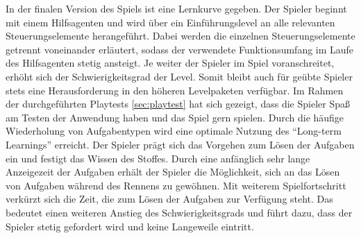 In der finalen Version des Spiels ist eine Lernkurve gegeben. Der Spieler beginnt mit einem Hilfsagenten und wird über ein Einführungslevel an alle relevanten Steuerungselemente herangeführt. Dabei werden die einzelnen Steuerungselemente getrennt voneinander erläutert, sodass der verwendete Funktionsumfang im Laufe des Hilfsagenten stetig ansteigt. Je weiter der Spieler im Spiel voranschreitet, erhöht sich der Schwierigkeitsgrad der Level. Somit bleibt auch für geübte Spieler stets eine Herausforderung in den höheren Levelpaketen verfügbar. Im Rahmen der durchgeführten Playtests \ref{sec:playtest} hat sich gezeigt, dass die Spieler Spaß am Testen der Anwendung haben und das Spiel gern spielen. Durch die häufige Wiederholung von Aufgabentypen wird eine optimale Nutzung des \enquote{Long-term Learnings} erreicht. Der Spieler prägt sich das Vorgehen zum Lösen der Aufgaben ein und festigt das Wissen des Stoffes. Durch eine anfänglich sehr lange Anzeigezeit der Aufgaben erhält der Spieler die Möglichkeit, sich an das Lösen von Aufgaben während des Rennens zu gewöhnen. Mit weiterem Spielfortschritt verkürzt sich die Zeit, die zum Lösen der Aufgaben zur Verfügung steht. Das bedeutet einen weiteren Anstieg des Schwierigkeitsgrads und führt dazu, dass der Spieler stetig gefordert wird und keine Langeweile eintritt.
